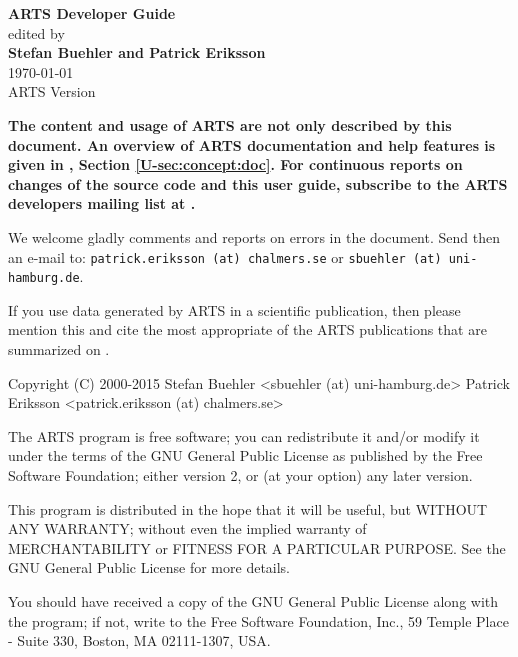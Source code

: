 \documentclass[11pt,twoside,a4paper,fleqn]{book}
\begin{document}
%
\renewcommand{\thepage}{title \arabic{page}} 

\thispagestyle{plain}
\begin{center}
  \vspace*{1cm}
  {\Huge \bf ARTS Developer Guide\\}
  \vspace*{1cm}
  {\large edited by \\}
  \vspace*{1cm}
  {\Large \bf Stefan Buehler and Patrick Eriksson}\\
   \vspace*{2cm}
   {\large \today\\
    ARTS Version 
   }
\end{center}
\vspace*{\fill}
{\normalsize \bf
  \noindent
  The content and usage of ARTS are not only described by this
  document. An overview of ARTS documentation and help features is
  given in \user, Section \ref{U-sec:concept:doc}. For continuous reports on
  changes of the source code and this user guide, subscribe to the
  ARTS developers mailing list at .

  We welcome gladly comments and reports on errors in the document.
  Send then an e-mail to: \verb|patrick.eriksson (at) chalmers.se| or 
  \verb|sbuehler (at) uni-hamburg.de|.

  If you use data generated by ARTS in a scientific
  publication, then please mention this and cite the most
  appropriate of the ARTS publications that are summarized on
  .
}

\newpage                          
\thispagestyle{empty}
\vspace*{\fill}
\noindent
\begin{code}
Copyright (C) 2000-2015
Stefan Buehler <sbuehler (at) uni-hamburg.de>
Patrick Eriksson <patrick.eriksson (at) chalmers.se>

The ARTS program is free software; you can redistribute it
and/or modify it under the terms of the GNU General Public
License as published by the Free Software Foundation; either
version 2, or (at your option) any later version.

This program is distributed in the hope that it will be
useful, but WITHOUT ANY WARRANTY; without even the implied
warranty of MERCHANTABILITY or FITNESS FOR A PARTICULAR
PURPOSE. See the GNU General Public License for more
details. 

You should have received a copy of the GNU General Public
License along with the program; if not, write to the Free
Software Foundation, Inc., 59 Temple Place - Suite 330,
Boston, MA 02111-1307, USA. 
\end{code}
\end{document}
